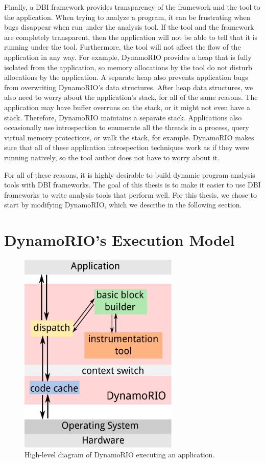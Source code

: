 Finally, a DBI framework provides transparency of the framework and the tool to
the application.  When trying to analyze a program, it can be frustrating when
bugs disappear when run under the analysis tool.  If the tool and the framework
are completely transparent, then the application will not be able to tell that
it is running under the tool.  Furthermore, the tool will not affect the flow
of the application in any way.  For example, DynamoRIO provides a heap that is
fully isolated from the application, so memory allocations by the tool do not
disturb allocations by the application.  A separate heap also prevents
application bugs from overwriting DynamoRIO's data structures.  After heap data
structures, we also need to worry about the application's stack, for all of the
same reasons.  The application may have buffer overruns on the stack, or it
might not even have a stack.  Therefore, DynamoRIO maintains a separate stack.
Applications also occasionally use introspection to enumerate all the threads
in a process, query virtual memory protections, or walk the stack, for example.
DynamoRIO makes sure that all of these application introspection techniques
work as if they were running natively, so the tool author does not have to
worry about it.

For all of these reasons, it is highly desirable to build dynamic program
analysis tools with DBI frameworks.  The goal of this thesis is to make it
easier to use DBI frameworks to write analysis tools that perform well.  For
this thesis, we chose to start by modifying DynamoRIO, which we describe in the
following section.

\section{DynamoRIO's Execution Model}

\begin{figure}
\begin{center}
\includegraphics[width=3in]{tool-flow.pdf}
\caption{High-level diagram of DynamoRIO executing an application.}
\label{fig:tool-flow}
\end{center}
\end{figure}

